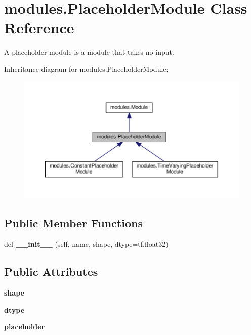 \hypertarget{classmodules_1_1_placeholder_module}{}\section{modules.\+Placeholder\+Module Class Reference}
\label{classmodules_1_1_placeholder_module}


A placeholder module is a module that takes no input.  




Inheritance diagram for modules.\+Placeholder\+Module\+:\nopagebreak
\begin{figure}[H]
\begin{center}
\leavevmode
\includegraphics[width=350pt]{classmodules_1_1_placeholder_module__inherit__graph}
\end{center}
\end{figure}
\subsection*{Public Member Functions}
\begin{DoxyCompactItemize}
\item 
\mbox{\label{classmodules_1_1_placeholder_module_ac715f9bd0c880b5807baf2954b2e3016}} 
def {\bfseries \+\_\+\+\_\+init\+\_\+\+\_\+} (self, name, shape, dtype=tf.\+float32)
\end{DoxyCompactItemize}
\subsection*{Public Attributes}
\begin{DoxyCompactItemize}
\item 
\mbox{\label{classmodules_1_1_placeholder_module_accdf8998b6179f359f4418953fe6a1ea}} 
{\bfseries shape}
\item 
\mbox{\label{classmodules_1_1_placeholder_module_afd076530b0b38cd09e323c0956275d49}} 
{\bfseries dtype}
\item 
\mbox{\label{classmodules_1_1_placeholder_module_a09945c3984e04b0ee2bcdc5cdecfded7}} 
{\bfseries placeholder}
\end{DoxyCompactItemize}


